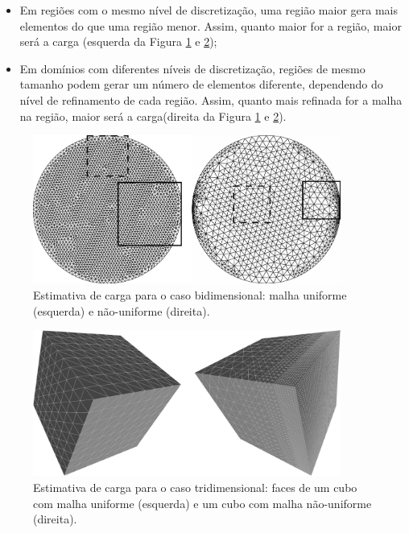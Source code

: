 \begin{itemize}
	\item Em regiões com o mesmo nível de discretização, uma região maior gera mais elementos do que uma região menor. Assim, quanto maior for a região, maior será a carga (esquerda da Figura \ref{fig:malha_uniforme_não_uniforme} e \ref{fig:malha_uniforme_não_uniforme_trid});
	\item Em domínios com diferentes níveis de discretização, regiões de mesmo tamanho podem gerar um número de elementos diferente, dependendo do nível de refinamento de cada região. Assim, quanto mais refinada for a malha na região, maior será a carga(direita da Figura \ref{fig:malha_uniforme_não_uniforme} e \ref{fig:malha_uniforme_não_uniforme_trid}).
\end{itemize}


\begin{figure}[!ht]
	\centering
	\includegraphics[width=0.9\textwidth]{fig/meshes_transition_and_uniform.png}
	\caption{Estimativa de carga para o caso bidimensional: malha uniforme (esquerda) e não-uniforme (direita).}
	\label{fig:malha_uniforme_não_uniforme}
\end{figure}

\begin{figure}[!ht]
	\centering
	\includegraphics[width=0.9\textwidth]{fig/cubes_comp_uniform.png}
	\caption{Estimativa de carga para o caso tridimensional: faces de um cubo com malha uniforme (esquerda) e um cubo com malha não-uniforme (direita).}
	\label{fig:malha_uniforme_não_uniforme_trid}
\end{figure}

